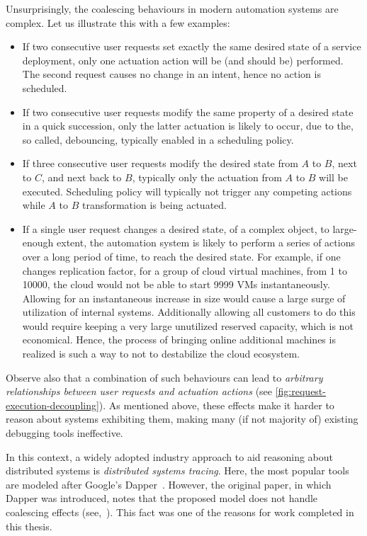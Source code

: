 Unsurprisingly, the coalescing behaviours in modern automation systems are complex. Let us illustrate this with a few examples:
%
\begin{itemize}
    \item If two consecutive user requests set exactly the same desired state of a service deployment, only one actuation action will be (and should be) performed. The second request causes no change in an intent, hence no action is scheduled.

    \item If two consecutive user requests modify the same property of a desired state in a quick succession, only the latter actuation is likely to occur, due to the, so called, debouncing, typically enabled in a scheduling policy.
    
    \item If three consecutive user requests modify the desired state from $A$ to $B$, next to $C$, and next back to $B$, typically only the actuation from $A$ to $B$ will be executed. Scheduling policy will typically not trigger any competing actions while $A$ to $B$ transformation is being actuated.
    
    \item If a single user request changes a desired state, of a complex object, to large-enough extent, the automation system is likely to perform a series of actions over a long period of time, to reach the desired state. For example, if one changes replication factor, for a group of cloud virtual machines, from 1 to 10000, the cloud would not be able to start 9999 VMs instantaneously. Allowing for an instantaneous increase in size would cause a large surge of utilization of internal systems. Additionally allowing all customers to do this would require keeping a very large unutilized reserved capacity, which is not economical. Hence, the process of bringing online additional machines is realized is such a way to not to destabilize the cloud ecosystem.
\end{itemize}
%
Observe also that a combination of such behaviours can lead to \textit{arbitrary relationships between user requests and actuation actions} (see \cref{fig:request-execution-decoupling}). As mentioned above, these effects make it harder to reason about systems exhibiting them, making many (if not majority of) existing debugging tools ineffective. 

In this context, a widely adopted industry approach to aid reasoning about distributed systems is \textit{distributed systems tracing}. Here, the most popular tools are modeled after Google’s Dapper~\cite{dapper2010}. However, the original paper, in which Dapper was introduced, notes that the proposed model does not handle coalescing effects (see,~). This fact was one of the reasons for work completed in this thesis.

